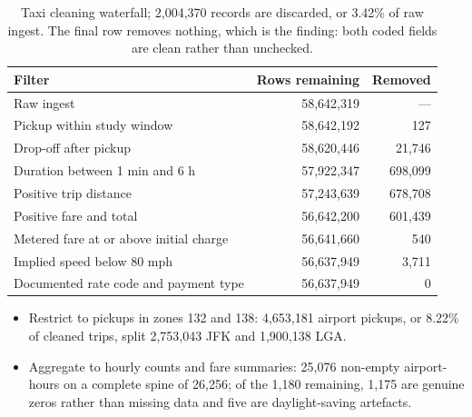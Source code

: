 \documentclass[11pt]{article}
\begin{document}
\begin{table}[htb]
\centering
\footnotesize
\begin{tabular}{lrr}
\toprule
Filter & Rows remaining & Removed \\
\midrule
Raw ingest                              & 58,642,319 & --- \\
Pickup within study window              & 58,642,192 & 127 \\
Drop-off after pickup                   & 58,620,446 & 21,746 \\
Duration between 1 min and 6 h          & 57,922,347 & 698,099 \\
Positive trip distance                  & 57,243,639 & 678,708 \\
Positive fare and total                 & 56,642,200 & 601,439 \\
Metered fare at or above initial charge & 56,641,660 & 540 \\
Implied speed below 80 mph              & 56,637,949 & 3,711 \\
Documented rate code and payment type   & 56,637,949 & 0 \\
\bottomrule
\end{tabular}
\caption{Taxi cleaning waterfall; 2,004,370 records are discarded, or 3.42\% of
raw ingest. The final row removes nothing, which is the finding: both coded
fields are clean rather than unchecked.}
\label{tab:taxi_waterfall}
\end{table}
 
\begin{itemize}
  \item Restrict to pickups in zones 132 and 138: 4,653,181 airport pickups, or
        8.22\% of cleaned trips, split 2,753,043 JFK and 1,900,138 LGA.
  \item Aggregate to hourly counts and fare summaries: 25,076 non-empty
        airport-hours on a complete spine of 26,256; of the 1,180 remaining,
        1,175 are genuine zeros rather than missing data and five are
        daylight-saving artefacts.
\end{itemize}
 
\end{document}
